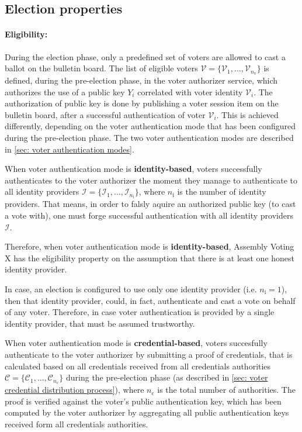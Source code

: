 \subsection{Election properties} \label{sec: election properties}


\paragraph{Eligibility:}
During the election phase, only a predefined set of voters are allowed to cast a ballot on the bulletin board. The list of eligible voters $\boldsymbol{\mathcal{V}} = \{ \mathcal{V}_1, ..., \mathcal{V}_{n_\mathrm{v}} \}$ is defined, during the pre-election phase, in the voter authorizer service, which authorizes the use of a public key $Y_i$ correlated with voter identity $\mathcal{V}_i$. The authorization of public key is done by publishing a voter session item on the bulletin board, after a successful authentication of voter $\mathcal{V}_i$. This is achieved differently, depending on the voter authentication mode that has been configured during the pre-election phase. The two voter authentication modes are described in \cref{sec: voter authentication modes}.

When voter authentication mode is \textbf{identity-based}, voters successfully authenticates to the voter authorizer the moment they manage to authenticate to all identity providers $\boldsymbol{\mathcal{I}} = \{ \mathcal{I}_1, ..., \mathcal{I}_{n_\mathrm{i}} \}$, where $n_\mathrm{i}$ is the number of identity providers. That means, in order to falsly aquire an authorized public key (to cast a vote with), one must forge successful authentication with all identity providers $\boldsymbol{\mathcal{I}}$.

Therefore, when voter authentication mode is \textbf{identity-based}, Assembly Voting X has the eligibility property on the assumption that there is at least one honest identity provider.

In case, an election is configured to use only one identity provider (i.e. $n_\mathrm{i} = 1$), then that identity provider, could, in fact, authenticate and cast a vote on behalf of any voter. Therefore, in case voter authentication is provided by a single identity provider, that must be assumed trustworthy.

When voter authentication mode is \textbf{credential-based}, voters  succesfully authenticate to the voter authorizer by submitting a proof of credentials, that is calculated based on all credentials received from all credentials authorities $\boldsymbol{\mathcal{C}} = \{ \mathcal{C}_1, ..., \mathcal{C}_{n_\mathrm{c}} \}$ during the pre-election phase (as described in \cref{sec: voter credential distribution process}), where $n_\mathrm{c}$ is the total number of authorities. The proof is verified against the voter's public authentication key, which has been computed by the voter authorizer by aggregating all public authentication keys received form all credentials authorities.

